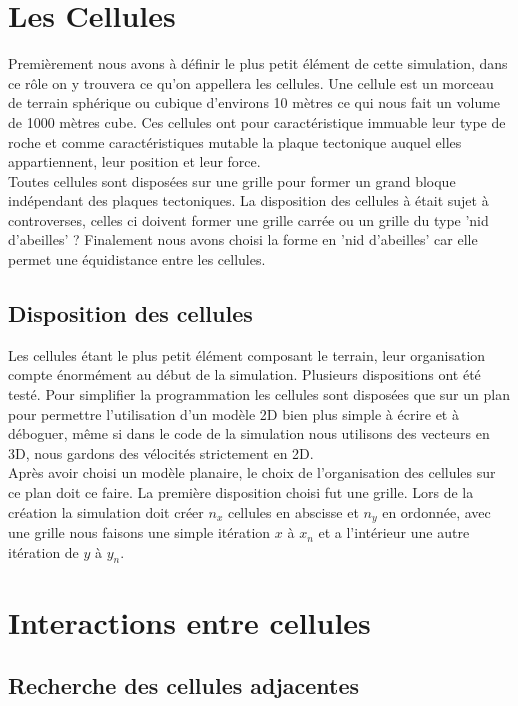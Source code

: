 \documentclass[a4paper,10pt]{article}
\begin{document}
\section{Les Cellules}

Premièrement nous avons à définir le plus petit élément de cette simulation, dans ce rôle on y trouvera ce qu'on appellera les cellules. Une cellule est un morceau de terrain sphérique ou cubique  d'environs 10 mètres ce qui nous fait un volume de 1000 mètres cube. Ces cellules ont pour caractéristique immuable leur type de roche et comme caractéristiques mutable la plaque tectonique auquel elles appartiennent, leur position et leur force. \\

Toutes cellules sont disposées sur une grille pour former un grand bloque indépendant des plaques tectoniques. La disposition des cellules à était sujet à controverses, celles ci doivent former une grille carrée ou un grille du type 'nid d'abeilles' ? Finalement nous avons choisi la forme en 'nid d'abeilles' car elle permet une équidistance entre les cellules. \\

\subsection{Disposition des cellules}

Les cellules étant le plus petit élément composant le terrain, leur organisation compte énormément au début de la simulation. Plusieurs dispositions ont été testé. Pour simplifier la programmation les cellules sont disposées que sur un plan pour permettre l'utilisation d'un modèle 2D bien plus simple à écrire et à déboguer, même si dans le code de la simulation nous utilisons des vecteurs en 3D, nous gardons des vélocités strictement en 2D. \\
Après avoir choisi un modèle planaire, le choix de l'organisation des cellules sur ce plan doit ce faire. La première disposition choisi fut une grille. Lors de la création la simulation doit créer $n_x$ cellules en abscisse et $n_y$ en ordonnée, avec une grille nous faisons une simple itération $x$ à $x_n$ et a l'intérieur une autre itération de $y$ à $y_n$.

\section{Interactions entre cellules}

\subsection{Recherche des cellules adjacentes}
\end{document}
